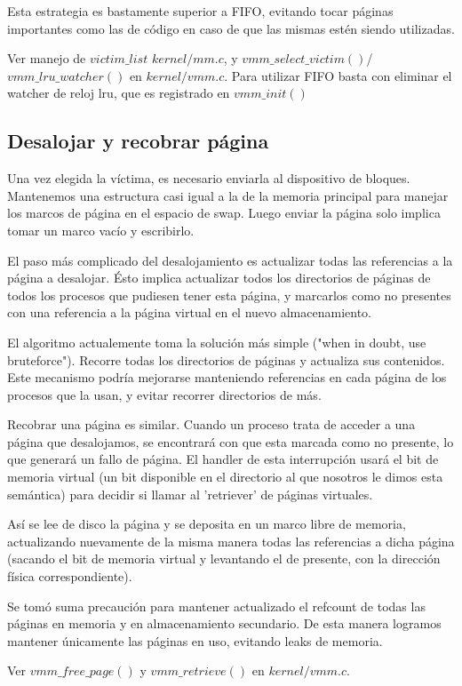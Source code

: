 Esta estrategia es bastamente superior a FIFO, evitando tocar páginas
importantes como las de código en caso de que las mismas estén siendo
utilizadas.

Ver manejo de $victim\_list$ $kernel/mm.c$, y
$vmm\_select\_victim()$/$vmm\_lru\_watcher()$ en $kernel/vmm.c$. Para utilizar
FIFO basta con eliminar el watcher de reloj lru, que es registrado en
$vmm\_init()$

\subsection{Desalojar y recobrar página}

Una vez elegida la víctima, es necesario enviarla al dispositivo de bloques.
Mantenemos una estructura casi igual a la de la memoria principal para manejar
los marcos de página en el espacio de swap. Luego enviar la página solo implica
tomar un marco vacío y escribirlo.

El paso más complicado del desalojamiento es actualizar todas las referencias a
la página a desalojar. Ésto implica actualizar todos los directorios de páginas
de todos los procesos que pudiesen tener esta página, y marcarlos como no
presentes con una referencia a la página virtual en el nuevo almacenamiento.

El algoritmo actualemente toma la solución más simple ("when in doubt, use
bruteforce"). Recorre todas los directorios de páginas y actualiza sus
contenidos. Este mecanismo podría mejorarse manteniendo referencias en cada
página de los procesos que la usan, y evitar recorrer directorios de más.

Recobrar una página es similar. Cuando un proceso trata de acceder a una página
que desalojamos, se encontrará con que esta marcada como no presente, lo que
generará un fallo de página. El handler de esta interrupción usará el bit de
memoria virtual (un bit disponible en el directorio al que nosotros le dimos
esta semántica) para decidir si llamar al 'retriever' de páginas virtuales.

Así se lee de disco la página y se deposita en un marco libre de memoria,
actualizando nuevamente de la misma manera todas las referencias a dicha página
(sacando el bit de memoria virtual y levantando el de presente, con la dirección
física correspondiente).

Se tomó suma precaución para mantener actualizado el refcount de todas las
páginas en memoria y en almacenamiento secundario. De esta manera logramos
mantener únicamente las páginas en uso, evitando leaks de memoria.

Ver $vmm\_free\_page()$ y $vmm\_retrieve()$ en $kernel/vmm.c$.
